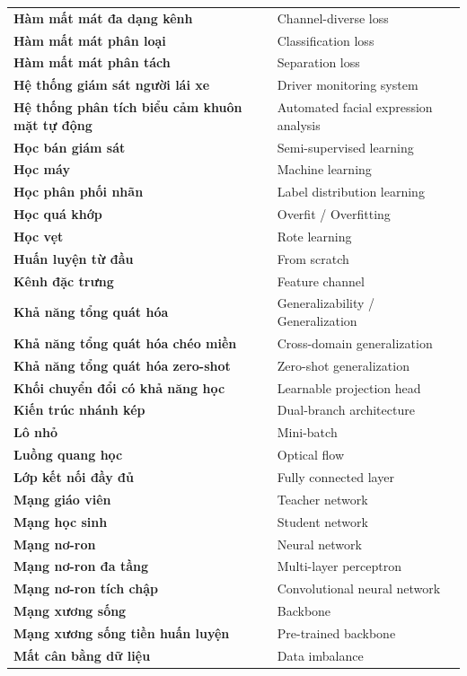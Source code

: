 \begin{longtable}{p{6.5cm} p{8.5cm}}
\textbf{Hàm mất mát đa dạng kênh} & Channel-diverse loss \\
\textbf{Hàm mất mát phân loại} & Classification loss \\
\textbf{Hàm mất mát phân tách} & Separation loss \\
\textbf{Hệ thống giám sát người lái xe} & Driver monitoring system \\
\textbf{Hệ thống phân tích biểu cảm khuôn mặt tự động} & Automated facial expression analysis \\
\textbf{Học bán giám sát} & Semi-supervised learning \\
\textbf{Học máy} & Machine learning \\
\textbf{Học phân phối nhãn} & Label distribution learning \\
\textbf{Học quá khớp} & Overfit / Overfitting \\
\textbf{Học vẹt} & Rote learning \\
\textbf{Huấn luyện từ đầu} & From scratch \\
\textbf{Kênh đặc trưng} & Feature channel \\
\textbf{Khả năng tổng quát hóa} & Generalizability / Generalization \\
\textbf{Khả năng tổng quát hóa chéo miền} & Cross-domain generalization \\
\textbf{Khả năng tổng quát hóa zero-shot} & Zero-shot generalization \\
\textbf{Khối chuyển đổi có khả năng học} & Learnable projection head \\
\textbf{Kiến trúc nhánh kép} & Dual-branch architecture \\
\textbf{Lô nhỏ} & Mini-batch \\
\textbf{Luồng quang học} & Optical flow \\
\textbf{Lớp kết nối đầy đủ} & Fully connected layer \\
\textbf{Mạng giáo viên} & Teacher network \\
\textbf{Mạng học sinh} & Student network \\
\textbf{Mạng nơ-ron} & Neural network \\
\textbf{Mạng nơ-ron đa tầng} & Multi-layer perceptron \\
\textbf{Mạng nơ-ron tích chập} & Convolutional neural network \\
\textbf{Mạng xương sống} & Backbone \\
\textbf{Mạng xương sống tiền huấn luyện} & Pre-trained backbone \\
\textbf{Mất cân bằng dữ liệu} & Data imbalance \\

\end{longtable}
